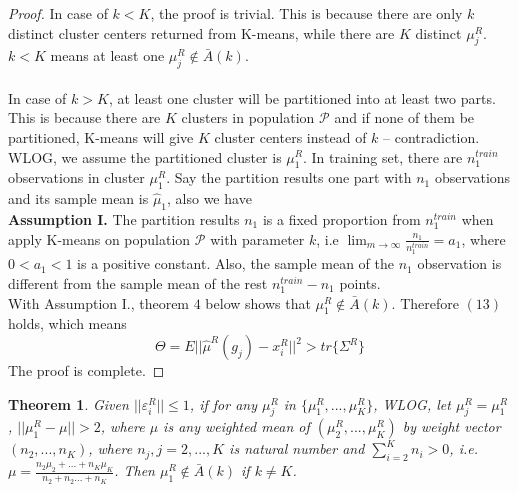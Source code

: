 \documentclass[11pt]{article}
\newtheorem{theorem}{Theorem}
\begin{document}
\begin{proof}
In case of $k < K$, the proof is trivial. This is because there are only $k$ distinct cluster centers returned from K-means, while there are $K$ distinct $\mu^R_j$. $k < K$ means at least one $\mu^R_j \notin \bar{A}(k)$. \\\\
In case of $k > K$, at least one cluster will be partitioned into at least two parts. This is because there are $K$ clusters in population $\mathcal{P}$ and if none of them be partitioned, K-means will give $K$ cluster centers instead of $k$ -- contradiction.\\

WLOG, we assume the partitioned cluster is $\mu^R_1$. In training set, there are $n^{train}_1$ observations in cluster $\mu^R_1$. Say the partition results one part with $n_1$ observations and its sample mean is $\hat{\mu}_1$, also we have \\

\textbf{Assumption I.} The partition results $n_1$ is a fixed proportion from $n^{train}_1$ when apply K-means on population $\mathcal{P}$ with parameter $k$, i.e $\lim_{m \to \infty} \frac{n_1}{n^{train}_1} = a_1$, where $0< a_1< 1$ is a positive constant. Also, the sample mean of the $n_1$ observation is different from the sample mean of the rest $n^{train}_1-n_1$ points.\\

With Assumption I., theorem $4$ below shows that $\mu^R_1 \notin \bar{A}(k)$. Therefore $(13)$ holds, which means 
\[\Theta = E||\hat{\mu}^R \left(g_j\right) - x^R_i||^2 > tr\{\Sigma^R\} \]
The proof is complete.
\end{proof}
\begin{theorem} 
Given $||\varepsilon^R_i||\leq1$, if for any $\mu^R_j$ in  $\{\mu^R_1,...,\mu^R_K\}$, WLOG, let $\mu^R_j = \mu^R_1$, $ ||\mu^R_1 - \mu|| > 2$, where $\mu$ is any weighted mean of $(\mu^R_2,...,\mu^R_{K})$ by weight vector $(n_2,...,n_{K})$, where $n_j,j=2,...,K$ is natural number and $\sum^{K}_{i=2}n_i >0$, i.e. $ \mu = \frac{n_2\mu_2+...+n_{K}\mu_{K}}{n_2+n_2...+n_{K}}$. Then $\mu^R_1 \notin \bar{A}(k)$ if $k \neq K$.
\end{theorem}
\end{document}
